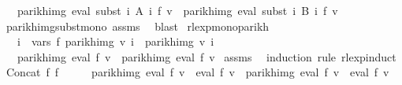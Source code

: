 \begin{isabellebody}
\ \ \ {\isachardoublequoteopen}parikh{\isacharunderscore}{\kern0pt}img\ {\isacharparenleft}{\kern0pt}eval\ {\isacharparenleft}{\kern0pt}subst\ {\isacharparenleft}{\kern0pt}{\isasymlambda}i{\isachardot}{\kern0pt}\ A\ i{\isacharparenright}{\kern0pt}\ f{\isacharparenright}{\kern0pt}\ v{\isacharparenright}{\kern0pt}\ {\isacharequal}{\kern0pt}\ parikh{\isacharunderscore}{\kern0pt}img\ {\isacharparenleft}{\kern0pt}eval\ {\isacharparenleft}{\kern0pt}subst\ {\isacharparenleft}{\kern0pt}{\isasymlambda}i{\isachardot}{\kern0pt}\ B\ i{\isacharparenright}{\kern0pt}\ f{\isacharparenright}{\kern0pt}\ v{\isacharparenright}{\kern0pt}{\isachardoublequoteclose}\isanewline
%
\isadelimproof
\ \ %
\endisadelimproof
%
\isatagproof
{}\isamarkupfalse%
\ parikh{\isacharunderscore}{\kern0pt}img{\isacharunderscore}{\kern0pt}subst{\isacharunderscore}{\kern0pt}mono\ assms\ \isamarkupfalse%
\ blast%
\endisatagproof
{\isafoldproof}%
%
\isadelimproof
\isanewline
%
\endisadelimproof
\isanewline
{}\isamarkupfalse%
\ rlexp{\isacharunderscore}{\kern0pt}mono{\isacharunderscore}{\kern0pt}parikh{\isacharcolon}{\kern0pt}\isanewline
\ \ \ {\isachardoublequoteopen}{\isasymforall}i\ {\isasymin}\ vars\ f{\isachardot}{\kern0pt}\ parikh{\isacharunderscore}{\kern0pt}img\ {\isacharparenleft}{\kern0pt}v\ i{\isacharparenright}{\kern0pt}\ {\isasymsubseteq}\ parikh{\isacharunderscore}{\kern0pt}img\ {\isacharparenleft}{\kern0pt}v{\isacharprime}{\kern0pt}\ i{\isacharparenright}{\kern0pt}{\isachardoublequoteclose}\isanewline
\ \ \ {\isachardoublequoteopen}parikh{\isacharunderscore}{\kern0pt}img\ {\isacharparenleft}{\kern0pt}eval\ f\ v{\isacharparenright}{\kern0pt}\ {\isasymsubseteq}\ parikh{\isacharunderscore}{\kern0pt}img\ {\isacharparenleft}{\kern0pt}eval\ f\ v{\isacharprime}{\kern0pt}{\isacharparenright}{\kern0pt}{\isachardoublequoteclose}\isanewline
%
\isadelimproof
%
\endisadelimproof
%
\isatagproof
{}\isamarkupfalse%
\ assms\ \isamarkupfalse%
\ {\isacharparenleft}{\kern0pt}induction\ rule{\isacharcolon}{\kern0pt}\ rlexp{\isachardot}{\kern0pt}induct{\isacharparenright}{\kern0pt}\isanewline
{}\isamarkupfalse%
\ {\isacharparenleft}{\kern0pt}Concat\ f{}\ f{}{\isacharparenright}{\kern0pt}\isanewline
\ \ \isamarkupfalse%
\ \isamarkupfalse%
\ {\isachardoublequoteopen}parikh{\isacharunderscore}{\kern0pt}img\ {\isacharparenleft}{\kern0pt}eval\ f{}\ v\ {\isacharat}{\kern0pt}{\isacharat}{\kern0pt}\ eval\ f{}\ v{\isacharparenright}{\kern0pt}\ {\isasymsubseteq}\ parikh{\isacharunderscore}{\kern0pt}img\ {\isacharparenleft}{\kern0pt}eval\ f{}\ v{\isacharprime}{\kern0pt}\ {\isacharat}{\kern0pt}{\isacharat}{\kern0pt}\ eval\ f{}\ v{\isacharprime}{\kern0pt}{\isacharparenright}{\kern0pt}{\isachardoublequoteclose}\isanewline

\end{isabellebody}

